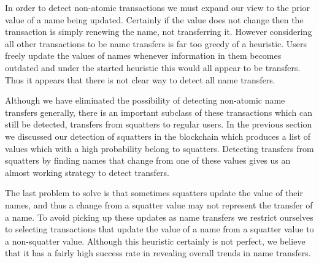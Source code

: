 In order to detect non-atomic transactions we must expand our view to the prior value of a name being updated. Certainly if the value does not change then the transaction is simply renewing the name, not transferring it. However considering all other transactions to be name transfers is far too greedy of a heuristic. Users freely update the values of names whenever information in them becomes outdated and under the started heuristic this would all appear to be transfers. Thus it appears that there is not clear way to detect all name transfers.

Although we have eliminated the possibility of detecting non-atomic name transfers generally, there is an important subclass of these transactions which can still be detected, transfers from squatters to regular users. In the previous section we discussed our detection of squatters in the blockchain which produces a list of values which with a high probability belong to squatters. Detecting transfers from squatters by finding names that change from one of these values gives us an almost working strategy to detect transfers.

The last problem to solve is that sometimes squatters update the value of their names, and thus a change from a squatter value may not represent the transfer of a name. To avoid picking up these updates as name transfers we restrict ourselves to selecting transactions that update the value of a name from a squatter value to a non-squatter value. Although this heuristic certainly is not perfect, we believe that it has a fairly high success rate in revealing overall trends in name transfers.

\textbf{}
	
